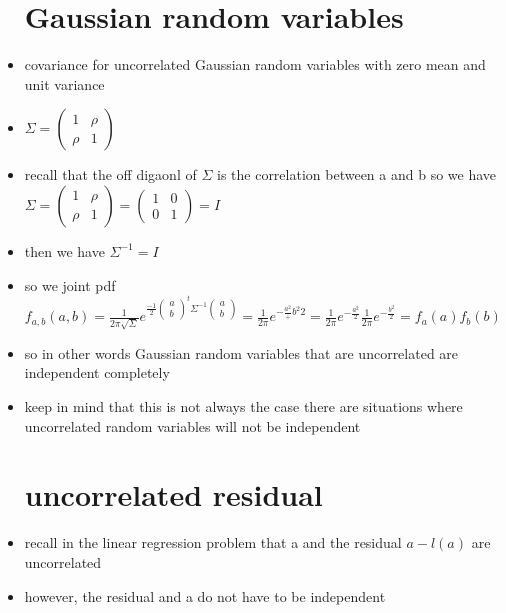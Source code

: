 \documentclass{article}
\begin{document}
\begin{itemize}
\section{Gaussian random variables}
\item covariance for uncorrelated Gaussian random variables with zero mean and unit variance 
\item $\Sigma=\begin{pmatrix} 1 & \rho\\ \rho & 1 \end{pmatrix}$
\item recall that the off digaonl of $\Sigma$ is the correlation between a and b so we have $\Sigma=\begin{pmatrix} 1 & \rho\\ \rho & 1 \end{pmatrix}=\begin{pmatrix} 1 & 0\\ 0 & 1 \end{pmatrix}=I$
\item then we have $\Sigma^{-1}=I$
\item so we joint pdf $f_{a,b}(a,b)=\frac{1}{2\pi \sqrt{\Sigma}}e^{\frac{-1}{2}\begin{pmatrix}
    a\\b
\end{pmatrix}^t\Sigma^{-1}\begin{pmatrix}
    a\\b
\end{pmatrix}}=\frac{1}{2\pi}e^{-\frac{a^2}+b^2{2}}=\frac{1}{2\pi}e^{-\frac{a^2}{2}}\frac{1}{2\pi}e^{-\frac{b^2}{2}}=f_{a}(a)f_{b}(b)$
\item so in other words Gaussian random variables that are uncorrelated are independent completely
\item keep in mind that this is not always the case there are situations where uncorrelated random variables will not be independent 
\section{uncorrelated residual }
\item recall in the linear regression problem that a and the residual $a-l(a)$ are uncorrelated 
\item however, the residual and a do not have to be independent

\end{itemize}
\end{document}
